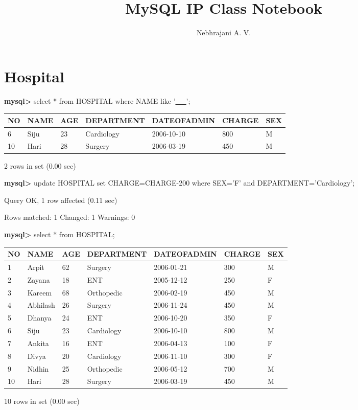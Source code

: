 \documentclass[11pt]{article}
\author{Nebhrajani A. V.}
\date{}
\title{MySQL IP Class Notebook}
\begin{document}
\maketitle
\tableofcontents


\section{Hospital}
\label{sec:orgd445b13}
\textbf{mysql>} select * from HOSPITAL where NAME like '\uline{\_\_}';
\begin{center}
\begin{tabular}{|l|l|l|l|l|l|l|}
\hline
NO & NAME & AGE & DEPARTMENT & DATEOFADMIN & CHARGE & SEX \\
\hline
6 & Siju & 23 & Cardiology & 2006-10-10 & 800 & M \\
10 & Hari & 28 & Surgery & 2006-03-19 & 450 & M \\
\hline
\end{tabular}
\end{center}
2 rows in set (0.00 sec)

\textbf{mysql>} update HOSPITAL set CHARGE=CHARGE-200 where SEX='F' and DEPARTMENT='Cardiology';

Query OK, 1 row affected (0.11 sec)

Rows matched: 1  Changed: 1  Warnings: 0

\textbf{mysql>} select * from HOSPITAL;
\begin{center}
\begin{tabular}{|l|l|l|l|l|l|l|}
\hline
NO & NAME & AGE & DEPARTMENT & DATEOFADMIN & CHARGE & SEX \\
\hline
1 & Arpit & 62 & Surgery & 2006-01-21 & 300 & M \\
2 & Zayana & 18 & ENT & 2005-12-12 & 250 & F \\
3 & Kareem & 68 & Orthopedic & 2006-02-19 & 450 & M \\
4 & Abhilash & 26 & Surgery & 2006-11-24 & 450 & M \\
5 & Dhanya & 24 & ENT & 2006-10-20 & 350 & F \\
6 & Siju & 23 & Cardiology & 2006-10-10 & 800 & M \\
7 & Ankita & 16 & ENT & 2006-04-13 & 100 & F \\
8 & Divya & 20 & Cardiology & 2006-11-10 & 300 & F \\
9 & Nidhin & 25 & Orthopedic & 2006-05-12 & 700 & M \\
10 & Hari & 28 & Surgery & 2006-03-19 & 450 & M \\
\hline
\end{tabular}
\end{center}
10 rows in set (0.00 sec)
\end{document}
